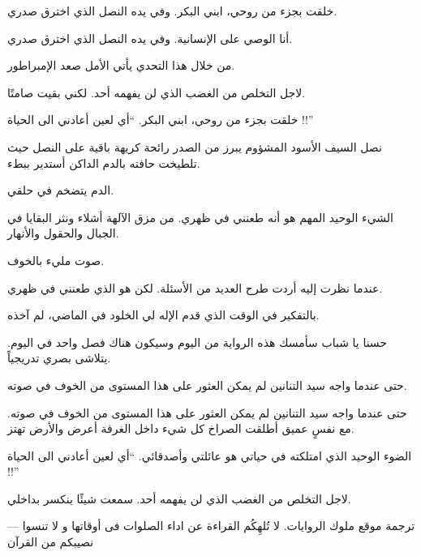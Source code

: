 خلقت بجزء من روحي، ابني البكر.
وفي يده النصل الذي اخترق صدري.

أنا الوصي على الإنسانية.
وفي يده النصل الذي اخترق صدري.




من خلال هذا التحدي يأتي الأمل صعد الإمبراطور.


لاجل التخلص من الغضب الذي لن يفهمه أحد.
لكني بقيت صامتًا.




خلقت بجزء من روحي، ابني البكر.
“أي لعين أعادني الى الحياة !!”

نصل السيف الأسود المشؤوم يبرز من الصدر رائحة كريهة باقية على النصل حيث تلطيخت حافته بالدم الداكن أستدير ببطء.



الدم يتضخم في حلقي.

الشيء الوحيد المهم هو أنه طعنني في ظهري.
من مزق الآلهة أشلاء ونثر البقايا في الجبال والحقول والأنهار.

صوت مليء بالخوف.


عندما نظرت إليه أردت طرح العديد من الأسئلة.
لكن هو الذي طعنني في ظهري.

بالتفكير في الوقت الذي قدم الإله لي الخلود في الماضي، لم آخذه.


حسنا يا شباب سأمسك هذه الرواية من اليوم وسيكون هناك فصل واحد في اليوم.
يتلاشى بصري تدريجياً.


حتى عندما واجه سيد التنانين لم يمكن العثور على هذا المستوى من الخوف في صوته.

حتى عندما واجه سيد التنانين لم يمكن العثور على هذا المستوى من الخوف في صوته.
مع نفسٍ عميق أطلقت الصراخ كل شيء داخل الغرفة أعرض والأرض تهتز.

الضوء الوحيد الذي امتلكته في حياتي هو عائلتي وأصدقائي.
“أي لعين أعادني الى الحياة !!”




لاجل التخلص من الغضب الذي لن يفهمه أحد.
سمعت شيئًا ينكسر بداخلي.







---
ترجمة موقع ملوك الروايات. لا تُلهِكُم القراءة عن اداء الصلوات فى أوقاتها و لا تنسوا نصيبكم من القرآن
